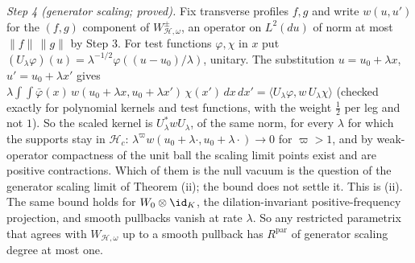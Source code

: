 \emph{Step 4 (generator scaling; proved).} Fix transverse profiles $f, g$ and write $w(u, u')$ for the $(f, g)$ component of $W^{\pm}_{\mathcal{H},\omega}$, an operator on $L^{2}(du)$ of norm at most $\|f\|\,\|g\|$ by Step 3. For test functions $\varphi, \chi$ in $x$ put $(U_{\lambda}\varphi)(u) = \lambda^{-1/2}\varphi((u - u_{0})/\lambda)$, unitary. The substitution $u = u_{0} + \lambda x$, $u' = u_{0} + \lambda x'$ gives $\lambda\int\!\!\int\bar\varphi(x)\,w(u_{0} + \lambda x, u_{0} + \lambda x')\,\chi(x')\,dx\,dx' = \langle U_{\lambda}\varphi, w\,U_{\lambda}\chi\rangle$ (checked exactly for polynomial kernels and test functions, with the weight $\tfrac12$ per leg and not $1$). So the scaled kernel is $U_{\lambda}^{*}wU_{\lambda}$, of the same norm, for every $\lambda$ for which the supports stay in $\mathcal{H}_{c}$: $\lambda^{\varpi}w(u_{0} + \lambda\cdot, u_{0} + \lambda\cdot) \to 0$ for $\varpi > 1$, and by weak-operator compactness of the unit ball the scaling limit points exist and are positive contractions. Which of them is the null vacuum is the question of the generator scaling limit of Theorem (ii); the bound does not settle it. This is (ii). The same bound holds for $W_{0}\otimes\id_{K}$, the dilation-invariant positive-frequency projection, and smooth pullbacks vanish at rate $\lambda$. So any restricted parametrix that agrees with $W_{\mathcal{H},\omega}$ up to a smooth pullback has $R^{\mathrm{par}}$ of generator scaling degree at most one.

